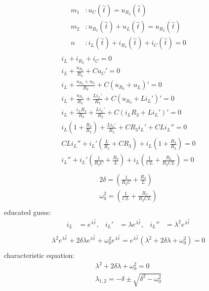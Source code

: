 \documentclass[a4paper]{article}
\begin{document}
\begin{align*}
	m_1&: u_C(\overset{\sim }{t}) = u_{R_2}(\overset{\sim }{t})\\
	m_2&: u_{R_3}(\overset{\sim }{t}) + u_L(\overset{\sim }{t}) = u_{R_2}(\overset{\sim }{t})\\
	n&: i_L(\overset{\sim }{t}) + i_{R_2}(\overset{\sim }{t}) + i_C(\overset{\sim }{t}) = 0\\
\end{align*}
\begin{align*}
	i_L + i_{R_2} + i_C = 0\\
	i_L + \frac{u_{R_2}}{R_2} + Cu_C' = 0\\
	i_L + \frac{u_{R_3} + u_L}{R_2} + C(u_{R_3} + u_L)' = 0\\
	i_L + \frac{u_{R_3}}{R_2} + \frac{Li_L'}{R_2} + C(u_{R_3} + Li_L')' = 0\\
	i_L + \frac{i_LR_3}{R_2} + \frac{Li_L'}{R_2} + C(i_LR_3 + Li_L')' = 0\\
	i_L \left(1 + \frac{R_3}{R_2} \right) + \frac{Li_L'}{R_2} + CR_3i_L' + CLi_L'' = 0\\
	CLi_L'' + i_L'\left( \frac{L}{R_2} + CR_3 \right) + i_L \left(1 + \frac{R_3}{R_2} \right) = 0\\
	i_L'' + i_L'\left( \frac{1}{R_2C} + \frac{R_3}{L} \right) + i_L \left(\frac{1}{CL} + \frac{R_3}{R_2CL} \right) = 0\\
\end{align*}
\begin{align*}
	2\delta = \left( \frac{1}{R_2C} + \frac{R_3}{L} \right)\\
	\omega_0^2 = \left(\frac{1}{CL} + \frac{R_3}{R_2CL} \right)\\
\end{align*}
educated guess:
\begin{align*}
	i_L &= e^{\lambda \overset{\sim }{t}},&
	i_L' &= \lambda e^{\lambda \overset{\sim }{t}},&
	i_L'' &= \lambda^2 e^{\lambda \overset{\sim }{t}}\\
\end{align*}
\begin{align*}
	\lambda^2 e^{\lambda \overset{\sim }{t}} + 2\delta\lambda e^{\lambda \overset{\sim }{t}} + \omega_0^2 e^{\lambda \overset{\sim }{t}} 
	= e^{\lambda \overset{\sim }{t}}(\lambda^2 + 2\delta\lambda + \omega_0^2) = 0\\
\end{align*}
characteristic equation:
\begin{align*}
	\lambda^2 + 2\delta\lambda + \omega_0^2 = 0\\
	\lambda_{1,2} = -\delta \pm \sqrt{\delta^2 - \omega_0^2}\\
\end{align*}
\end{document}
